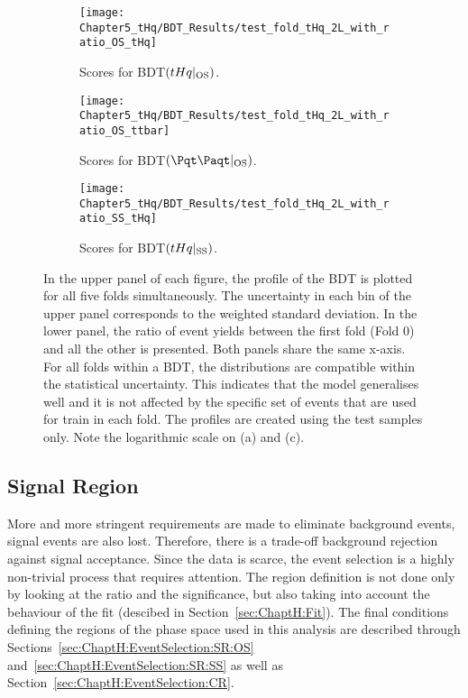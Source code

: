 \begin{figure}[h]
  \centering  
  \begin{subfigure}[b]{0.31\textwidth}
    \centering
    \texttt{[image: Chapter5\_tHq/BDT\_Results/test\_fold\_tHq\_2L\_with\_ratio\_OS\_tHq]}
    \caption{Scores for BDT$(tHq|_{\text{OS}})$.}
     \label{fig:ChaptH:EventSelection:BDT:OS_ScoresCombo:tHq}
  \end{subfigure}
  \hfill
  \begin{subfigure}[b]{0.31\textwidth}
    \centering
    \texttt{[image: Chapter5\_tHq/BDT\_Results/test\_fold\_tHq\_2L\_with\_ratio\_OS\_ttbar]}
    \caption{Scores for BDT$(\ttbar|_{\text{OS}})$.}
     \label{fig:ChaptH:EventSelection:BDT:OS_ScoresCombo_ttbar}
  \end{subfigure}
    \hfill
  \begin{subfigure}[b]{0.31\textwidth}
    \centering
    \texttt{[image: Chapter5\_tHq/BDT\_Results/test\_fold\_tHq\_2L\_with\_ratio\_SS\_tHq]}
    \caption{Scores for BDT$(tHq|_{\text{SS}})$.}
     \label{fig:ChaptH:EventSelection:BDT:SS_ScoresCombo_tHq}
  \end{subfigure}
  \caption{In the upper panel of each figure, the profile of the BDT is plotted for all 
  		five folds simultaneously. The uncertainty in each bin of the upper panel corresponds
		to the weighted %
		standard deviation. In the lower panel, the ratio of event yields between the first fold (Fold 0) and
		all the other is presented.
		Both panels share the same x-axis.
  		For all folds within a BDT, the distributions are compatible within the statistical uncertainty. 
		This indicates that the model generalises well and it is not affected by the specific set 
		of events that are used for train in each fold.
		The profiles are created using the test samples only. 
  		Note the logarithmic scale on (a) and (c).}
  \label{fig:ChaptH:EventSelection:BDT:OS_ScoresCombo}
\end{figure}




\FloatBarrier
\subsection{Signal Region}
\label{sec:ChaptH:EventSelection:SR}
More and more stringent requirements are made to eliminate background events,  
signal events are also lost. Therefore, there is a trade-off background rejection against signal acceptance. 
Since the \tHq data is scarce, the event selection
is a highly non-trivial process that requires attention. 
The region definition is not done only by looking at the \StoB ratio
and the significance, but also taking into account the behaviour of the fit (descibed
in Section~\ref{sec:ChaptH:Fit}). 
The final conditions defining the regions of the phase space used in this analysis
are described through Sections~\ref{sec:ChaptH:EventSelection:SR:OS}
and~\ref{sec:ChaptH:EventSelection:SR:SS} as well as Section~\ref{sec:ChaptH:EventSelection:CR}.


